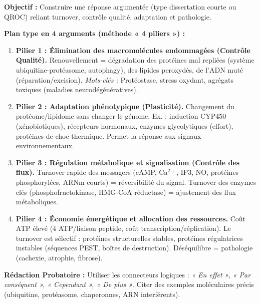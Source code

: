 \documentclass[11pt]{article}
\begin{document}
\begin{methode}
\textbf{Objectif :} Construire une réponse argumentée (type dissertation courte ou QROC) reliant turnover, contrôle qualité, adaptation et pathologie.
\par
\textbf{Plan type en 4 arguments (méthode « 4 piliers ») :}
\begin{enumerate}
    \item \textbf{Pilier 1 : Élimination des macromolécules endommagées (Contrôle Qualité).} 
    Renouvellement = dégradation des protéines mal repliées (système ubiquitine-protéasome, autophagy), des lipides peroxydés, de l'ADN muté (réparation/excision). \emph{Mots-clés :} Protéostase, stress oxydant, agrégats toxiques (maladies neurodégénératives).
    \item \textbf{Pilier 2 : Adaptation phénotypique (Plasticité).} 
    Changement du protéome/lipidome sans changer le génome. Ex. : induction CYP450 (xénobiotiques), récepteurs hormonaux, enzymes glycolytiques (effort), protéines de choc thermique. Permet la réponse aux signaux environnementaux.
    \item \textbf{Pilier 3 : Régulation métabolique et signalisation (Contrôle des flux).} 
    Turnover rapide des messagers (cAMP, Ca$^{2+}$, IP3, NO, protéines phosphorylées, ARNm courts) = réversibilité du signal. Turnover des enzymes clés (phosphofructokinase, HMG-CoA réductase) = ajustement des flux métaboliques.
    \item \textbf{Pilier 4 : Économie énergétique et allocation des ressources.} 
    Coût ATP élevé (4 ATP/liaison peptide, coût transcription/réplication). Le turnover est sélectif : protéines structurelles stables, protéines régulatrices instables (séquences PEST, boîtes de destruction). Déséquilibre = pathologie (cachexie, atrophie, fibrose).
\end{enumerate}
\textbf{Rédaction Probatoire :} Utiliser les connecteurs logiques : \emph{« En effet », « Par conséquent », « Cependant », « De plus »}. Citer des exemples moléculaires précis (ubiquitine, protéasome, chaperonnes, ARN interférents).
\end{methode}
\end{document}
